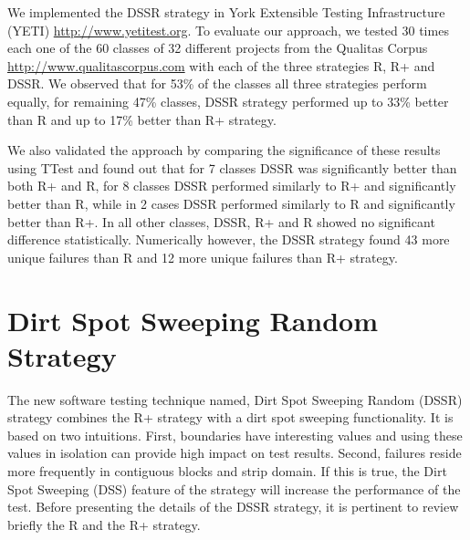 

We implemented the DSSR strategy in York Extensible Testing Infrastructure (YETI) \url{http://www.yetitest.org}. To evaluate our approach, we tested 30 times each one of the 60 classes of 32 different projects from the Qualitas Corpus \url{http://www.qualitascorpus.com} with each of the three strategies R, R+ and DSSR. We observed that for 53\% of the classes all three strategies perform equally, for remaining 47\% classes, DSSR strategy performed up to 33\% better than R and up to 17\% better than R+ strategy.

We also validated the approach by comparing the significance of these results using TTest and found out that for 7 classes DSSR was significantly better than both R+ and R, for 8 classes DSSR performed similarly to R+ and significantly better than R, while in 2 cases DSSR performed similarly to R and significantly better than R+. In all other classes, DSSR, R+ and R showed no significant difference statistically. Numerically however, the DSSR strategy found 43 more unique failures than R and 12 more unique failures than R+ strategy. 






\section{Dirt Spot Sweeping Random Strategy}\label{sec:dssr}
The new software testing technique named, Dirt Spot Sweeping Random (DSSR) strategy combines the R+ strategy with a dirt spot sweeping functionality. It is based on two intuitions. First, boundaries have interesting values and using these values in isolation can provide high impact on test results. Second, failures reside more frequently in contiguous blocks and strip domain. If this is true, the Dirt Spot Sweeping (DSS) feature of the strategy will increase the performance of the test. Before presenting the details of the DSSR strategy, it is pertinent to review briefly the R and the R+ strategy.

